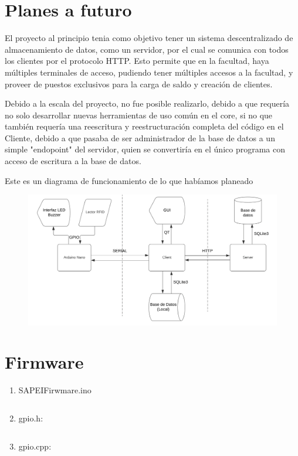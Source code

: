 \documentclass[a4paper, 12pt]{report}
\begin{document}
\newpage
\section{Planes a futuro}
    El proyecto al principio tenia como objetivo tener un sistema descentralizado de almacenamiento de datos, como un
    servidor, por el cual se comunica con todos los clientes por el protocolo HTTP. Esto permite que en la facultad,
    haya múltiples terminales de acceso, pudiendo tener múltiples accesos a la facultad, y proveer de puestos
    exclusivos para la carga de saldo y creación de clientes.

    Debido a la escala del proyecto, no fue posible realizarlo, debido a que requería no solo desarrollar nuevas
    herramientas de uso común en el core, si no que también requería una reescritura y reestructuración completa del
    código en el Cliente, debido a que pasaba de ser administrador de la base de datos a un simple "endopoint" del
    servidor, quien se convertiría en el único programa con acceso de escritura a la base de datos.

    Este es un diagrama de funcionamiento de lo que habíamos planeado
    \begin{figure}[h]
        \centering
        \includegraphics[width=1\textwidth]{./image2.png}
    \end{figure}

\newpage
\section{Firmware}
\begin{enumerate}[left=0pt]
    \item SAPEIFirwmare.ino
    \inputminted{c++}{../SAPEIFirmware/SAPEIFirmware.ino}
    \newpage
    \item gpio.h:
    \inputminted{c++}{../SAPEIFirmware/src/lib/gpio.h}
    \item gpio.cpp:
    \inputminted{c++}{../SAPEIFirmware/src/lib/gpio.cpp}
\end{enumerate}
\end{document}
